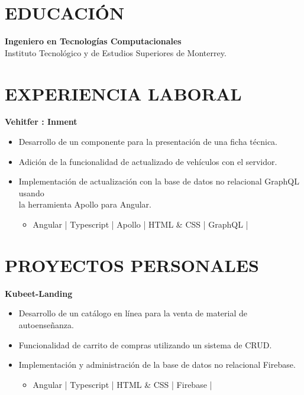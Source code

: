 \documentclass{res}
\begin{document}
\address{
}

\begin{resume}
    \vspace{-4mm}
    \separator

    \section{\large{EDUCACIÓN}} 
    \textbf{Ingeniero en Tecnologías Computacionales} 
     \\
    Instituto Tecnológico y de Estudios Superiores de Monterrey.
    
    \section{\large{EXPERIENCIA LABORAL}} 
    \textbf{Vehitfer : Inment} 
    \begin{itemize}
        \item Desarrollo de un componente para la presentación de una ficha técnica.
        \item Adición de la funcionalidad de actualizado de vehículos con el servidor.
        \item Implementación de actualización con la base de datos no relacional GraphQL usando \\ la herramienta Apollo para Angular.
        \begin{itemize}
            \item Angular | Typescript | Apollo | HTML \& CSS | GraphQL |
        \end{itemize}
    \end{itemize}

    \section{\large{PROYECTOS PERSONALES}} 
    \textbf{Kubeet-Landing} 
    \begin{itemize}
        \item Desarrollo de un catálogo en línea para la venta de material de autoenseñanza.
        \item Funcionalidad de carrito de compras utilizando un sistema de CRUD.
        \item Implementación y administración de la base de datos no relacional Firebase.
        \begin{itemize}
            \item Angular | Typescript | HTML \& CSS | Firebase |
        \end{itemize}
    \end{itemize}


\end{resume}
\end{document}
